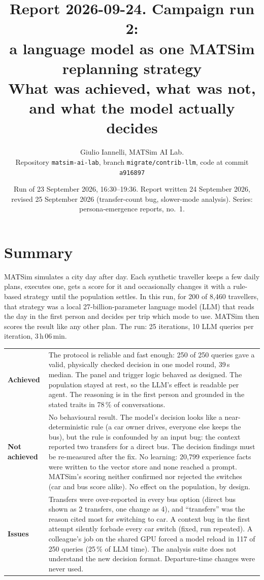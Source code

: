 \documentclass[10pt,a4paper]{article}
\title{\vspace{-1.2cm}\Large Report 2026-09-24. Campaign run 2:\\a language model as one MATSim replanning strategy\\\large What was achieved, what was not, and what the model actually decides}
\author{\normalsize Giulio Iannelli, MATSim AI Lab.\\\normalsize Repository \texttt{matsim-ai-lab}, branch \texttt{migrate/contrib-llm}, code at commit \texttt{a916897}}
\date{\normalsize Run of 23 September 2026, 16:30--19:36. Report written 24 September 2026, revised 25 September 2026 (transfer-count bug, slower-mode analysis). Series: persona-emergence reports, no.~1.}
\begin{document}
\maketitle\vspace{-0.9cm}

\section*{Summary}
\noindent MATSim simulates a city day after day. Each synthetic traveller keeps a few daily plans, executes one, gets a score for it and occasionally changes it with a rule-based strategy until the population settles. In this run, for 200 of 8,460 travellers, that strategy was a local 27-billion-parameter language model (LLM) that reads the day in the first person and decides per trip which mode to use. MATSim then scores the result like any other plan. The run: 25 iterations, 10 LLM queries per iteration, 3\,h\,06\,min.

\begin{tabularx}{\textwidth}{@{}>{\bfseries}p{2.3cm}X@{}}
Achieved & The protocol is reliable and fast enough: 250 of 250 queries gave a valid, physically checked decision in one model round, 39\,s median. The panel and trigger logic behaved as designed. The population stayed at rest, so the LLM's effect is readable per agent. The reasoning is in the first person and grounded in the stated traits in 78\,\% of conversations. \\[2pt]
Not achieved & No behavioural result. The model's decision looks like a near-deterministic rule (a car owner drives, everyone else keeps the bus), but the rule is confounded by an input bug: the context reported two transfers for a direct bus. The decision findings must be re-measured after the fix. No learning: 20,799 experience facts were written to the vector store and none reached a prompt. MATSim's scoring neither confirmed nor rejected the switches (car and bus score alike). No effect on the population, by design. \\[2pt]
Issues & Transfers were over-reported in every bus option (direct bus shown as 2 transfers, one change as 4), and ``transfers'' was the reason cited most for switching to car. A context bug in the first attempt silently forbade every car switch (fixed, run repeated). A colleague's job on the shared GPU forced a model reload in 117 of 250 queries (25\,\% of LLM time). The analysis suite does not understand the new decision format. Departure-time changes were never used. \\
\end{tabularx}
\end{document}

